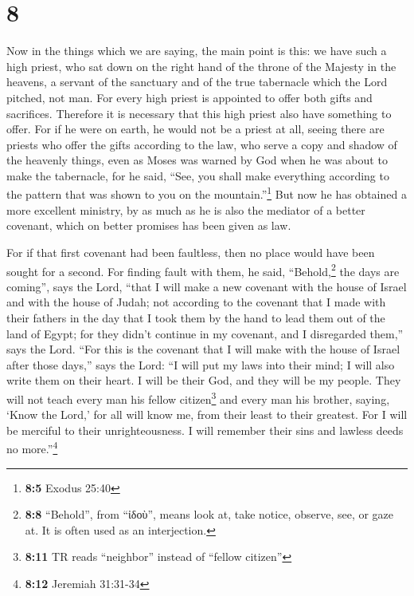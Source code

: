 \hypertarget{section-7}{%
\section{8}\label{section-7}}

 Now in the things which we are saying, the main point is
this: we have such a high priest, who sat down on the right hand of the
throne of the Majesty in the heavens,  a servant of the
sanctuary and of the true tabernacle which the Lord pitched, not man.
 For every high priest is appointed to offer both gifts
and sacrifices. Therefore it is necessary that this high priest also
have something to offer.  For if he were on earth, he
would not be a priest at all, seeing there are priests who offer the
gifts according to the law,  who serve a copy and shadow
of the heavenly things, even as Moses was warned by God when he was
about to make the tabernacle, for he said, ``See, you shall make
everything according to the pattern that was shown to you on the
mountain.''\footnote{\textbf{8:5} Exodus 25:40}  But now
he has obtained a more excellent ministry, by as much as he is also the
mediator of a better covenant, which on better promises has been given
as law.

 For if that first covenant had been faultless, then no
place would have been sought for a second.  For finding
fault with them, he said, ``Behold,\footnote{\textbf{8:8} ``Behold'',
  from ``ἰδοὺ'', means look at, take notice, observe, see, or gaze at.
  It is often used as an interjection.} the days are coming'', says the
Lord, ``that I will make a new covenant with the house of Israel and
with the house of Judah;  not according to the covenant
that I made with their fathers in the day that I took them by the hand
to lead them out of the land of Egypt; for they didn't continue in my
covenant, and I disregarded them,'' says the Lord.  ``For
this is the covenant that I will make with the house of Israel after
those days,'' says the Lord: ``I will put my laws into their mind; I
will also write them on their heart. I will be their God, and they will
be my people.  They will not teach every man his fellow
citizen\footnote{\textbf{8:11} TR reads ``neighbor'' instead of ``fellow
  citizen''} and every man his brother, saying, `Know the Lord,' for all
will know me, from their least to their greatest.  For I
will be merciful to their unrighteousness. I will remember their sins
and lawless deeds no more.''\footnote{\textbf{8:12} Jeremiah 31:31-34}

